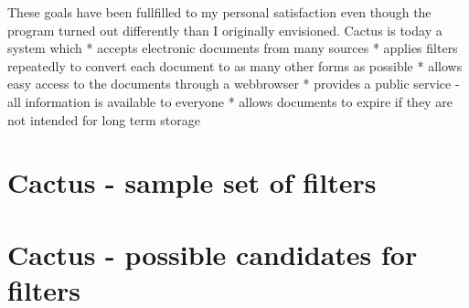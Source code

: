 These goals have been fullfilled to my personal satisfaction
even though the program turned out differently than I
originally envisioned. Cactus is today a system which *
accepts electronic documents from many sources * applies
filters repeatedly to convert each document to as many other
forms as possible * allows easy access to the documents
through a webbrowser * provides a public service - all
information is available to everyone * allows documents to
expire if they are not intended for long term storage


\chapter{Cactus - sample set of filters}
\label{cha:cactus-sample-set-of-filters}


\chapter{Cactus - possible candidates for filters}
\label{cha:cactus-possible-candidates-for-filters}














